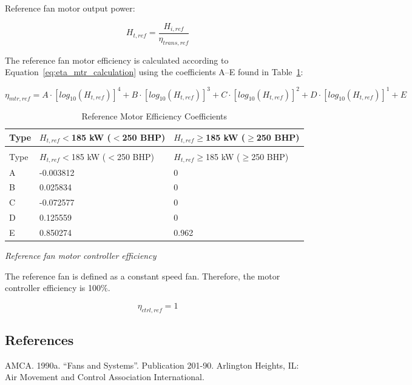 {{{Reference fan motor output power:

\begin{equation}
H_{t,ref}=\frac{H_{i,ref}}{\eta_{trans,ref}}
\label{eq:eta_ref_calculation}
\end{equation}

The reference fan motor efficiency is calculated according to Equation~\ref{eq:eta_mtr_calculation} using the coefficients A–E found in Table~\ref{table:reference-motor-efficiency-coefficients}:

\begin{equation}
\eta_{mtr,ref} = A\cdot[log_{10} (H_{t,ref})]^4 + B\cdot[log_{10} (H_{t,ref})]^3 +C\cdot[log_{10} (H_{t,ref})]^2 +D\cdot[log_{10} (H_{t,ref})]^1 + E
\label{eq:eta_mtr_calculation}
\end{equation}

\begin{longtable}[c]{p{1.0in}p{1.5in}p{1.5in}}
\caption{Reference Motor Efficiency Coefficients \label{table:reference-motor-efficiency-coefficients}} \tabularnewline
\toprule 
Type & \(H_{t,ref}\)$<$185 kW ($<$250 BHP) & \(H_{t,ref}\)$\geq$185 kW ($\geq$250 BHP) \tabularnewline \midrule
\midrule
\endfirsthead

\caption[]{Reference Motor Efficiency Coefficients} \tabularnewline
\toprule 
Type & \(H_{t,ref}\)$<$185 kW ($<$250 BHP) & \(H_{t,ref}\)$\geq$185 kW ($\geq$250 BHP) \tabularnewline \midrule
\midrule
\endhead

A & -0.003812 & 0 \tabularnewline
B & 0.025834 & 0 \tabularnewline
C & -0.072577 & 0 \tabularnewline
D & 0.125559 & 0 \tabularnewline
E & 0.850274 & 0.962 \tabularnewline
\bottomrule
\end{longtable}

\emph{Reference fan motor controller efficiency}


The reference fan is defined as a constant speed fan. Therefore, the motor controller efficiency is 100$\%$.

\begin{equation}
\eta_{ctrl,ref} = 1
\label{eq:eta_ctrl_calculation}
\end{equation}

\subsection{References}\label{references-002}

AMCA. 1990a. ``Fans and Systems''. Publication 201-90. Arlington Heights, IL: Air Movement and Control Association International.

}}}
